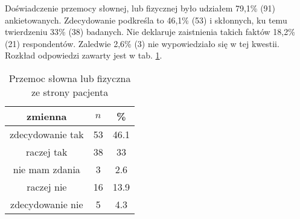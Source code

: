 
Doświadczenie przemocy słownej, lub fizycznej było udziałem 79,1\% (91) ankietowanych. Zdecydowanie podkreśla to 46,1\% (53) i skłonnych, ku temu twierdzeniu 33\% (38) badanych. Nie deklaruje zaistnienia takich faktów 18,2\% (21) respondentów. Zaledwie 2,6\% (3) nie wypowiedziało się w tej kwestii. Rozkład odpowiedzi zawarty jest w tab. \ref{tab:Q16}. 

\begin{table}[H]
\caption{Przemoc słowna lub fizyczna ze strony pacjenta}
\centering
\begin{tabular}{ | c | c | c |}
\hline
zmienna & $n$ & \% \\
\hline
zdecydowanie tak  &  53  & 46.1 \\
\hline
raczej tak  &  38  & 33 \\
\hline
nie mam zdania  &  3  & 2.6\\
\hline
raczej nie  &  16  & 13.9 \\
\hline
zdecydowanie nie  &  5  & 4.3 \\
\hline
\end{tabular}
\label{tab:Q16}
\end{table}
